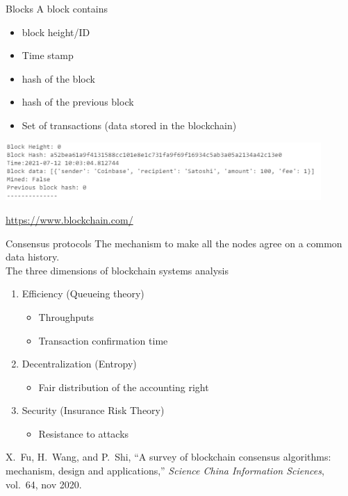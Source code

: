 \documentclass{beamer}
\begin{document}
\begin{frame}{Blocks}
A block contains
\begin{itemize}
  \item block height/ID
  \item Time stamp
  \item hash of the block
  \item hash of the previous block
  \item Set of transactions (data stored in the blockchain)
\end{itemize}
\begin{center}
\includegraphics[width=0.9\textwidth]{../../../Figures/genesis_block.png}
\end{center}
\url{https://www.blockchain.com/}
\end{frame}

\begin{frame}{Consensus protocols}
The mechanism to make all the nodes agree on a common data history.\\
\vspace{0.3cm}
The three dimensions of blockchain systems analysis
\begin{enumerate}
  \item Efficiency (Queueing theory)
  \begin{itemize}
    \item Throughputs
    \item Transaction confirmation time
  \end{itemize}
  \item Decentralization (Entropy)
  \begin{itemize}
    \item Fair distribution of the accounting right
  \end{itemize}
  \item Security (Insurance Risk Theory)
  \begin{itemize}
    \item Resistance to attacks
  \end{itemize}
\end{enumerate}
\footnotesize
\begin{thebibliography}{1}
X.~Fu, H.~Wang, and P.~Shi, ``A survey of blockchain consensus algorithms:
  mechanism, design and applications,'' {\em Science China Information
  Sciences}, vol.~64, nov 2020.
\end{thebibliography}
\end{frame}
\end{document}
